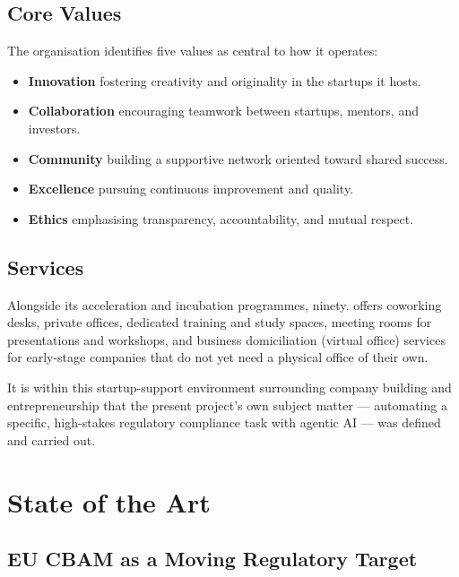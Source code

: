 \subsection*{Core Values}

The organisation identifies five values as central to how it operates:

\begin{itemize}[label=\textbullet]
    \item \textbf{Innovation} fostering creativity and originality in the
    startups it hosts.
    \item \textbf{Collaboration} encouraging teamwork between startups,
    mentors, and investors.
    \item \textbf{Community} building a supportive network oriented
    toward shared success.
    \item \textbf{Excellence} pursuing continuous improvement and
    quality.
    \item \textbf{Ethics} emphasising transparency, accountability, and
    mutual respect.
\end{itemize}

\subsection*{Services}

Alongside its acceleration and incubation programmes, ninety. offers
coworking desks, private offices, dedicated training and study spaces,
meeting rooms for presentations and workshops, and business
domiciliation (virtual office) services for early-stage companies that
do not yet need a physical office of their own.

It is within this startup-support environment surrounding company
building and entrepreneurship that the present project's own subject
matter --- automating a specific, high-stakes regulatory compliance task
with agentic AI --- was defined and carried out.

\section{State of the Art}

\subsection{EU CBAM as a Moving Regulatory Target}

